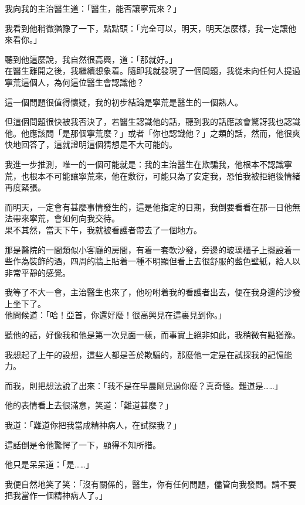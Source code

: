 我向我的主治醫生道：「醫生，能否讓寧荒來？」

我看到他稍微猶豫了一下，點點頭：「完全可以，明天，明天怎麼樣，我一定讓他來看你。」

聽到他這麼說，我自然很高興，道：「那就好。」
\\


在醫生離開之後，我繼續想象着。隨即我就發現了一個問題，我從未向任何人提過寧荒這個人，為何這位醫生會認識他？

這一個問題很值得懷疑，我的初步結論是寧荒是醫生的一個熟人。

但這個問題很快被我否決了，若醫生認識他的話，聽到我的話應該會驚訝我也認識他。他應該問「是那個寧荒麼？」或者「你也認識他？」之類的話，然而，他很爽快地回答了，這就證明這個猜想是不大可能的。

我進一步推測，唯一的一個可能就是：我的主治醫生在欺騙我，他根本不認識寧荒，也根本不可能讓寧荒來，他在敷衍，可能只為了安定我，恐怕我被拒絕後情緒再度緊張。

而明天，一定會有甚麼事情發生的，這是他指定的日期，我倒要看看在那一日他無法帶來寧荒，會如何向我交待。
\\


果不其然，當天下午，我就被看護者帶去了一個地方。

那是醫院的一間類似小客廳的房間，有着一套軟沙發，旁邊的玻璃櫃子上擺設着一些作為裝飾的酒，四周的牆上貼着一種不明顯但看上去很舒服的藍色壁紙，給人以非常平靜的感覺。

我等了不大一會，主治醫生也來了，他吩咐着我的看護者出去，便在我身邊的沙發上坐下了。
\\


他問候道：「哈！亞首，你還好麼！很高興見在這裏見到你。」

聽他的話，好像我和他是第一次見面一樣，而事實上絕非如此，我稍微有點猶豫。

我想起了上午的設想，這些人都是善於欺騙的，那麼他一定是在試探我的記憶能力。

而我，則把想法說了出來：「我不是在早晨剛見過你麼？真奇怪。難道是……」

他的表情看上去很滿意，笑道：「難道甚麼？」

我道：「難道你把我當成精神病人，在試探我？」

這話倒是令他驚愕了一下，顯得不知所措。

他只是呆呆道：「是……」

我便自然地笑了笑：「沒有關係的，醫生，你有任何問題，儘管向我發問。請不要把我當作一個精神病人了。」

